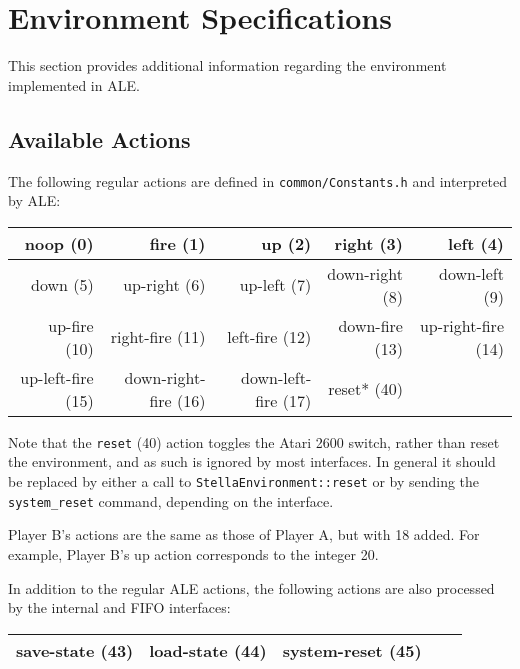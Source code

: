 \documentclass[12pt]{article}
\begin{document}
\section{Environment Specifications}\label{sec:environment_specifications}

This section provides additional information regarding the environment implemented in ALE.

\subsection{Available Actions}\label{sec:available_actions}

The following regular actions are defined in \verb+common/Constants.h+ and interpreted by ALE:

\begin{center}
\begin{tabular}{|r|r|r|r|r|}
\hline
noop (0) & fire (1) & up (2) & right (3) & left (4) \\
\hline
down (5) & up-right (6) & up-left (7) & down-right (8) & down-left (9) \\
\hline
up-fire (10) & right-fire (11) & left-fire (12) & down-fire (13) & up-right-fire (14) \\
\hline
up-left-fire (15) & down-right-fire (16) & down-left-fire (17) & reset* (40) & \\
\hline
\end{tabular}
\end{center}

Note that the \verb+reset+ (40) action toggles the Atari 2600 switch, rather than reset the 
environment, and as such is ignored by most interfaces.
In general it should be replaced by either a call to \verb+StellaEnvironment::reset+ or by
sending the \verb+system_reset+ command, depending on the interface. 

Player B's actions are the same as those of Player A, but with 18 added. For example, Player B's
up action corresponds to the integer 20.

In addition to the regular ALE actions, the following actions are also processed by the 
internal and FIFO interfaces:

\begin{center}
\begin{tabular}{|r|r|r|r|r|}
\hline
save-state (43) & load-state (44) & system-reset (45) \\
\hline
\end{tabular}
\end{center}
\end{document}
